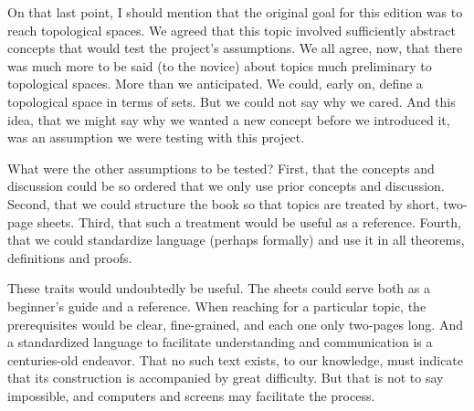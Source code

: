 On that last point, I should mention that the original goal for this edition was to reach topological spaces.
We agreed that this topic involved sufficiently abstract concepts that would test the project's assumptions.
We all agree, now, that there was much more to be said (to the novice) about topics much preliminary to topological spaces.
More than we anticipated.
We could, early on, define a topological space in terms of sets.
But we could not say why we cared.
And this idea, that we might say why we wanted a new concept before we introduced it, was an assumption we were testing with this project.

What were the other assumptions to be tested?
First, that the concepts and discussion could be so ordered that we only use prior concepts and discussion.
Second, that we could structure the book so that topics are treated by short, two-page sheets.
Third, that such a treatment would be useful as a reference.
Fourth, that we could standardize language (perhaps formally) and use it in all theorems, definitions and proofs.

These traits would undoubtedly be useful.
The sheets could serve both as a beginner's guide and a reference.
When reaching for a particular topic, the prerequisites would be clear, fine-grained, and each one only two-pages long.
And a standardized language to facilitate understanding and communication is a centuries-old endeavor.
That no such text exists, to our knowledge, must indicate that its construction is accompanied by great difficulty.
But that is not to say impossible, and computers and screens may facilitate the process.


